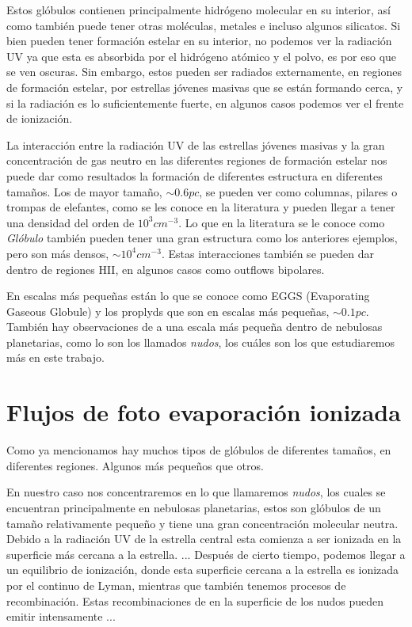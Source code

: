 \documentclass{book}
\begin{document}
Estos glóbulos contienen principalmente hidrógeno molecular en su interior, así como también puede tener otras moléculas, metales e incluso algunos silicatos. Si bien pueden tener formación estelar en su interior, no podemos ver la radiación UV ya que esta es absorbida por el hidrógeno atómico y el polvo, es por eso que se ven oscuras. Sin embargo, estos pueden ser radiados externamente, en regiones de formación estelar, por estrellas jóvenes masivas que se están formando cerca, y si la radiación es lo suficientemente fuerte, en algunos casos podemos ver el frente de ionización.

La interacción entre la radiación UV de las estrellas jóvenes masivas y la gran concentración de gas neutro en las diferentes regiones de formación estelar nos puede dar como resultados la formación de diferentes estructura en diferentes tamaños. Los de mayor tamaño, $\sim0.6 pc$, se pueden ver como columnas, pilares o trompas de elefantes, como se les conoce en la literatura y pueden llegar a tener una densidad del orden de $10^3cm^{-3}$. Lo que en la literatura se le conoce  como \textit{Glóbulo} también pueden tener una gran estructura como los anteriores ejemplos, pero son más densos, $\sim 10^4cm^{-3}$. Estas interacciones también se pueden dar dentro de regiones HII, en algunos casos como outflows bipolares.

En escalas más pequeñas están lo que se conoce como EGGS (Evaporating Gaseous Globule) y los proplyds que son en escalas más pequeñas, $\sim0.1 pc$. También hay observaciones de a una escala más pequeña dentro de nebulosas planetarias, como lo son los llamados \textit{nudos}, los cuáles son los que estudiaremos más en este trabajo.

\section{Flujos de foto evaporación ionizada}

Como ya mencionamos hay muchos tipos de glóbulos de diferentes tamaños, en diferentes regiones. Algunos más pequeños que otros. 

En nuestro caso nos concentraremos en lo que llamaremos \textit{nudos}, los cuales se encuentran principalmente en nebulosas planetarias, estos son glóbulos de un tamaño relativamente pequeño y tiene una gran concentración molecular neutra. Debido a la radiación UV de la estrella central esta comienza a ser ionizada en la superficie más cercana a la estrella. ...
Después de cierto tiempo, podemos llegar a un equilibrio de ionización, donde esta superficie cercana a la estrella es ionizada por el continuo de Lyman, mientras que también tenemos procesos de recombinación. Estas recombinaciones de en la superficie de los nudos pueden emitir intensamente ...
\end{document}
